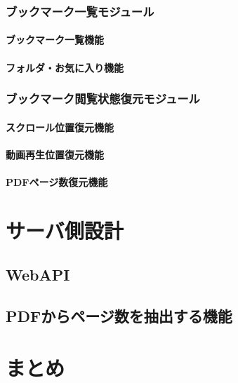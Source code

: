 \subsubsection{ブックマーク一覧モジュール}
\paragraph{ブックマーク一覧機能}
\paragraph{フォルダ・お気に入り機能}

\subsubsection{ブックマーク閲覧状態復元モジュール}
\paragraph{スクロール位置復元機能}
\paragraph{動画再生位置復元機能}
\paragraph{PDFページ数復元機能}

\section{サーバ側設計}
\subsection{WebAPI}
\subsection{PDFからページ数を抽出する機能}

\section{まとめ}